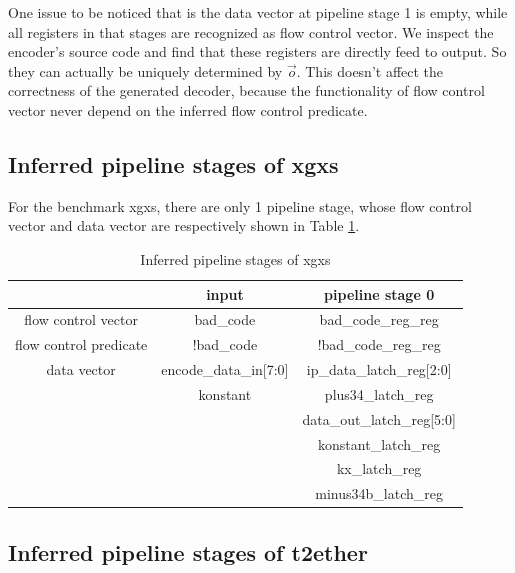 \documentclass[runningheads,a4paper,orivec]{llncs}
\begin{document}
One issue to be noticed that is the data vector at pipeline stage 1 is empty,
while all registers in that stages are recognized as flow control vector.
We inspect the encoder's source code and find that these registers are 
directly feed to output.
So they can actually be uniquely determined by $\vec{o}$.
This doesn't affect the correctness of the generated decoder,
because the functionality of flow control vector never depend on the inferred flow control predicate.


\subsection{Inferred pipeline stages of xgxs}


For the benchmark xgxs,
there are only 1 pipeline stage,
whose flow control vector and data vector are respectively shown in Table \ref{tab_xgxs}.

\begin{table}[b]
\centering
\caption{Inferred pipeline stages of xgxs}
\begin{tabular}{|c|c|c|}
\hline
                       & input                  &  pipeline stage 0    \\\hline\hline
flow control vector    &bad\_code               & bad\_code\_reg\_reg\\\hline
flow control predicate &!bad\_code              & !bad\_code\_reg\_reg \\\hline
data vector            &encode\_data\_in[7:0]   &ip\_data\_latch\_reg[2:0] \\
                       &konstant                &plus34\_latch\_reg     \\
                       &                        &data\_out\_latch\_reg[5:0]\\
                       &                        &konstant\_latch\_reg   \\
                       &                        &kx\_latch\_reg         \\
                       &                        &minus34b\_latch\_reg   \\\hline
\end{tabular}\label{tab_xgxs} 
\end{table}


\subsection{Inferred pipeline stages of t2ether}
\end{document}
